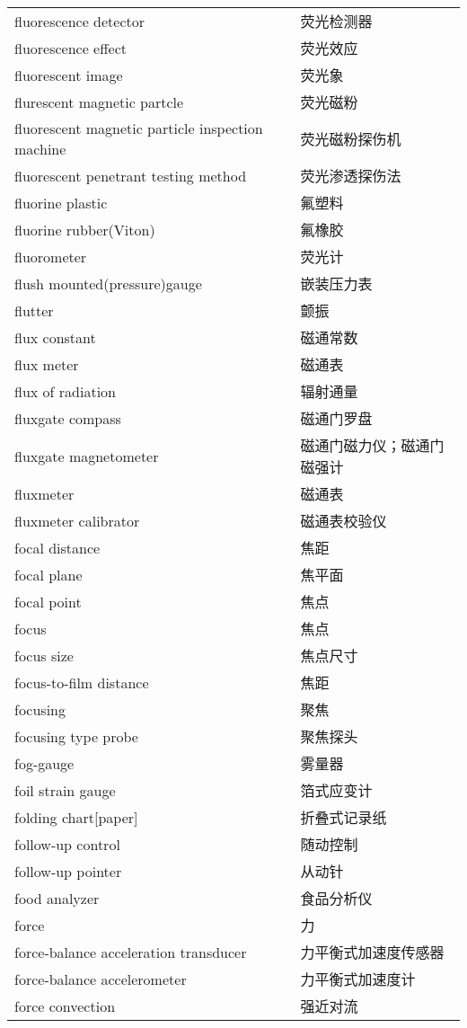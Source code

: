 \documentclass[
]{article}
\begin{document}
\begin{longtable}[]{@{}ll@{}}
fluorescence detector & 荧光检测器 \\
fluorescence effect & 荧光效应 \\
fluorescent image & 荧光象 \\
flurescent magnetic partcle & 荧光磁粉 \\
fluorescent magnetic particle inspection machine & 荧光磁粉探伤机 \\
fluorescent penetrant testing method & 荧光渗透探伤法 \\
fluorine plastic & 氟塑料 \\
fluorine rubber(Viton) & 氟橡胶 \\
fluorometer & 荧光计 \\
flush mounted(pressure)gauge & 嵌装压力表 \\
flutter & 颤振 \\
flux constant & 磁通常数 \\
flux meter & 磁通表 \\
flux of radiation & 辐射通量 \\
fluxgate compass & 磁通门罗盘 \\
fluxgate magnetometer & 磁通门磁力仪；磁通门磁强计 \\
fluxmeter & 磁通表 \\
fluxmeter calibrator & 磁通表校验仪 \\
focal distance & 焦距 \\
focal plane & 焦平面 \\
focal point & 焦点 \\
focus & 焦点 \\
focus size & 焦点尺寸 \\
focus-to-film distance & 焦距 \\
focusing & 聚焦 \\
focusing type probe & 聚焦探头 \\
fog-gauge & 雾量器 \\
foil strain gauge & 箔式应变计 \\
folding chart{[}paper{]} & 折叠式记录纸 \\
follow-up control & 随动控制 \\
follow-up pointer & 从动针 \\
food analyzer & 食品分析仪 \\
force & 力 \\
force-balance acceleration transducer & 力平衡式加速度传感器 \\
force-balance accelerometer & 力平衡式加速度计 \\
force convection & 强近对流 \\

\end{longtable}
\end{document}
